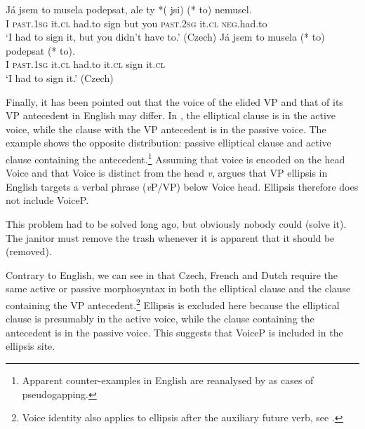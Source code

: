 \documentclass[output=paper,colorlinks,citecolor=brown,
modfonts
]{langscibook}
\begin{document}
\begin{exe}
\ex \label{28}
\begin{xlist}
\ex \label{28a} \gll Já jsem to musela podepsat, ale ty *(\hspace{-2pt} jsi) (*\hspace{-2pt} to) nemusel.\\
I \textsc{past}.\textsc{1sg} it.\textsc{cl} had.to sign but you {} \textsc{past}.\textsc{2sg} {} it.\textsc{cl} \textsc{neg}.had.to\\
\glt `I had to sign it, but you didn't have to.' \hfill (Czech)
\ex \label{28b} \gll Já jsem to musela  (*\hspace{-2pt} to)   podepsat (*\hspace{-2pt} to).\\
I \textsc{past}.\textsc{1sg} it.\textsc{cl} had.to  {} it.\textsc{cl}  sign  {} it.\textsc{cl} \\
\glt `I had to sign it.' \hfill (Czech)
\end{xlist}	
\end{exe}


\noindent Finally, it has been pointed out \citep{Hardt1993,Merchant2008a,Merchant2013} that the voice of the elided VP and that of its VP antecedent in English may differ. In , the elliptical clause is in the active voice, while the clause with the VP antecedent is in the passive voice. The example  shows the opposite distribution: passive elliptical clause and active clause containing the antecedent.\footnote{Apparent counter-examples in English are reanalysed by \cite{Merchant2013} as cases of pseudogapping.} Assuming that voice is encoded on the head Voice and that Voice is distinct from the head \textit{v}, \cite{Merchant2008a} argues that VP ellipsis in English targets a verbal phrase (\textit{v}P/VP) below Voice head. Ellipsis therefore does not include VoiceP. 

\begin{exe}
\ex \label{29}
\begin{xlist}
\ex \label{29a}This problem had to be solved long ago, but obviously nobody could (solve it). \hfill \citep{Merchant2008a}
\ex \label{29b}The janitor must remove the trash whenever it is apparent that it should be (removed). \hfill \citep{Merchant2008a}
\end{xlist}
\end{exe}


\noindent Contrary to English, we can see in  that Czech, French and Dutch require the same active or passive morphosyntax in both the elliptical clause and the clause containing the VP antecedent.\footnote{Voice identity also applies to ellipsis after the auxiliary future verb, see .} Ellipsis is excluded here because the elliptical clause is presumably in the active voice, while the clause containing the antecedent is in the passive voice. This suggests that VoiceP is included in the ellipsis site.
\end{document}
